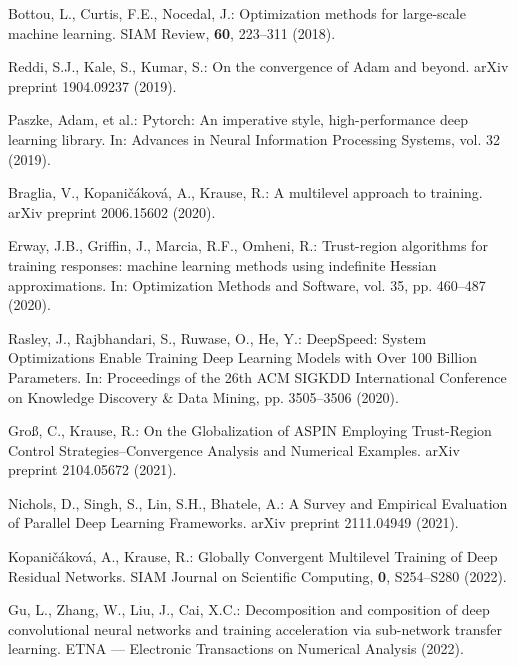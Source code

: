 \documentclass{article}
\begin{document}
\begin{thebibliography}{40.}
 Bottou, L., Curtis, F.E., Nocedal, J.: Optimization methods for large-scale machine learning. SIAM Review, \textbf{60}, 223–311 (2018). 

 Reddi, S.J., Kale, S., Kumar, S.: On the convergence of Adam and beyond. arXiv preprint 1904.09237 (2019).

 Paszke, Adam, et al.: Pytorch: An imperative style, high-performance deep learning library. In: Advances in Neural Information Processing Systems, vol. 32 (2019).

 Braglia, V., Kopaničáková, A., Krause, R.: A multilevel approach to training. arXiv preprint 2006.15602 (2020).

 Erway, J.B., Griffin, J., Marcia, R.F., Omheni, R.: Trust-region algorithms for training responses: machine learning methods using indefinite Hessian approximations. In: Optimization Methods and Software, vol. 35, pp. 460–487 (2020).

 Rasley, J., Rajbhandari, S., Ruwase, O., He, Y.: DeepSpeed: System Optimizations Enable Training Deep Learning Models with Over 100 Billion Parameters. In: Proceedings of the 26th ACM SIGKDD International Conference on Knowledge Discovery \& Data Mining, pp. 3505–3506 (2020).

 Groß, C., Krause, R.: On the Globalization of ASPIN Employing Trust-Region Control Strategies--Convergence Analysis and Numerical Examples. arXiv preprint 2104.05672 (2021).

 Nichols, D., Singh, S., Lin, S.H., Bhatele, A.: A Survey and Empirical Evaluation of Parallel Deep Learning Frameworks. arXiv preprint 2111.04949 (2021).

 Kopaničáková, A., Krause, R.: Globally Convergent Multilevel Training of Deep Residual Networks. SIAM Journal on Scientific Computing, \textbf{0}, S254–S280 (2022). 

 Gu, L., Zhang, W., Liu, J., Cai, X.C.: Decomposition and composition of deep convolutional neural networks and training acceleration via sub-network transfer learning. ETNA — Electronic Transactions on Numerical Analysis (2022).


\end{thebibliography}
\end{document}
